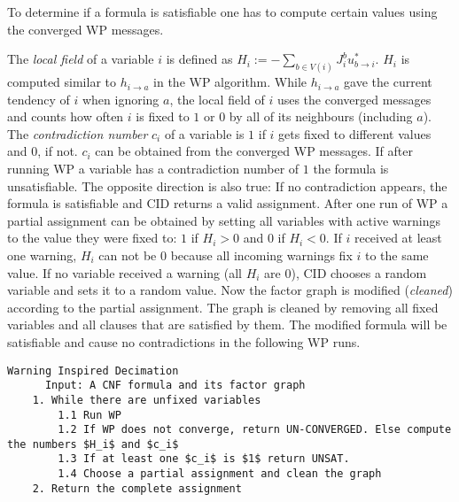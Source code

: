 To determine if a formula is satisfiable one has to compute certain values using the converged WP messages.

The \emph{local field} of a variable $i$ is defined as $H_i := - \sum_{b \in V(i)} J_i^b u^\ast_{b\rightarrow i}$. \newline $H_i$ is computed similar to $h_{i \rightarrow a}$ in the WP algorithm. While 
$h_{i \rightarrow a}$ gave the current tendency of $i$ when ignoring $a$, the local field of $i$ uses the converged messages and counts how often $i$ is fixed to $1$ or $0$ by all of its neighbours (including $a$). \newline
The \emph{contradiction number} $c_i$ of a variable is $1$ if $i$ gets fixed to different values and $0$, if not. $c_i$ can be obtained from the converged WP messages. If after running WP a variable has a contradiction number of $1$ the formula is unsatisfiable. \newline
The opposite direction is also true: If no contradiction appears, the formula is satisfiable and CID returns a valid assignment. 
After one run of WP a partial assignment can be obtained by setting all variables with active warnings to the value they were fixed to: $1$ if $H_i > 0$ and $0$ if $H_i < 0$. If $i$ received at least one warning, $H_i$ can not be $0$ because all incoming warnings fix $i$ to the same value. If no variable received a warning (all $H_i$ are $0$), CID chooses a random variable and sets it to a random value. \newline
Now the factor graph is modified (\emph{cleaned}) according to the partial assignment. The graph is cleaned by removing all fixed variables and all clauses that are satisfied by them.  The modified formula will be satisfiable and cause no contradictions in the following WP runs.
\newpage

\begin{lstlisting}[mathescape=true, frame = single]
	Warning Inspired Decimation
	  Input: A CNF formula and its factor graph 
	1. While there are unfixed variables
		1.1 Run WP
		1.2 If WP does not converge, return UN-CONVERGED. Else compute the numbers $H_i$ and $c_i$
		1.3 If at least one $c_i$ is $1$ return UNSAT.
		1.4 Choose a partial assignment and clean the graph
	2. Return the complete assignment
\end{lstlisting}


